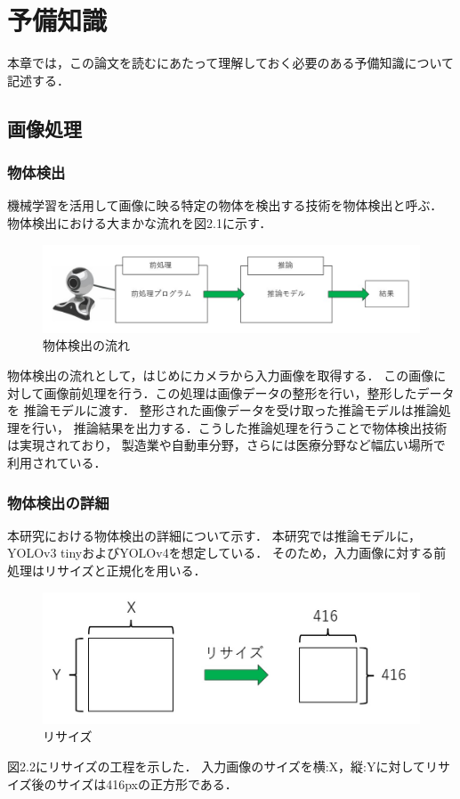 \documentclass[11pt,a4j]{jreport}
\begin{document}
\chapter{予備知識}
本章では，この論文を読むにあたって理解しておく必要のある予備知識について記述する．
\section{画像処理}
\subsection{物体検出}
機械学習を活用して画像に映る特定の物体を検出する技術を物体検出と呼ぶ．
物体検出における大まかな流れを図2.1に示す．
\begin{figure}[H]
  \center
  \includegraphics[scale = 0.8]{pict/pict4.jpg}
  \caption{物体検出の流れ}
\end{figure}
物体検出の流れとして，はじめにカメラから入力画像を取得する．
この画像に対して画像前処理を行う．この処理は画像データの整形を行い，整形したデータを
推論モデルに渡す．
整形された画像データを受け取った推論モデルは推論処理を行い，
推論結果を出力する．こうした推論処理を行うことで物体検出技術は実現されており，
製造業や自動車分野，さらには医療分野など幅広い場所で利用されている．

\subsection{物体検出の詳細}
本研究における物体検出の詳細について示す．
本研究では推論モデルに，YOLOv3 tinyおよびYOLOv4を想定している．
そのため，入力画像に対する前処理はリサイズと正規化を用いる．
\begin{figure}[H]
  \center
  \includegraphics[scale = 0.8]{pict/pict5.jpg}
  \caption{リサイズ}
\end{figure}
図2.2にリサイズの工程を示した．
入力画像のサイズを横:X，縦:Yに対してリサイズ後のサイズは416pxの正方形である．
\end{document}
